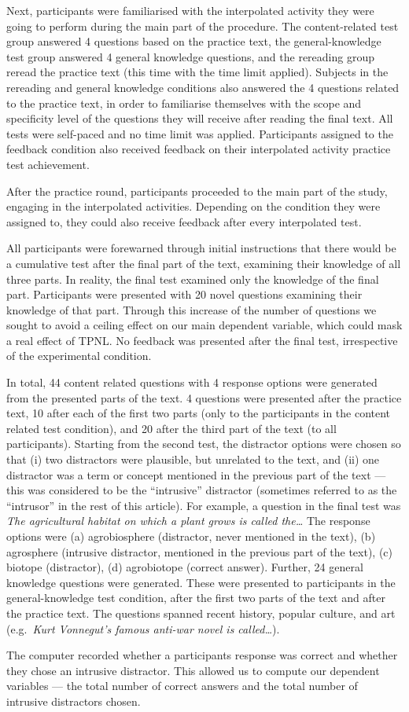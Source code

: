 Next, participants were familiarised with the interpolated activity they
were going to perform during the main part of the procedure. The
content-related test group answered 4 questions based on the practice
text, the general-knowledge test group answered 4 general knowledge
questions, and the rereading group reread the practice text (this time
with the time limit applied). Subjects in the rereading and general 
knowledge conditions also answered the 4 questions related to the
practice text, in order to familiarise themselves with the scope and
specificity level of the questions they will receive after reading the
final text. All tests were self-paced and no time limit was applied.
Participants assigned to the feedback condition also received feedback
on their interpolated activity practice test achievement.

After the practice round, participants proceeded to the main part of the
study, engaging in the interpolated activities. Depending on the condition 
they were assigned to, they could also receive feedback after every 
interpolated test.

All participants were forewarned through initial instructions that there 
would be a cumulative test after the final part of the text, examining
their knowledge of all three parts. In reality, the final test examined
only the knowledge of the final part. Participants were presented with 20 
novel questions examining their knowledge of that part. Through this 
increase of the number of questions we sought to avoid a ceiling effect on 
our main dependent variable, which could mask a real effect of TPNL. No 
feedback was presented after the final test, irrespective of the 
experimental condition.

In total, 44 content related questions with 4 response options were 
generated from the presented parts of the text. 4 questions were presented 
after the practice text, 10 after each of the first two parts (only to the 
participants in the content related test condition), and 20 after the third 
part of the text (to all participants). Starting from the second test, the 
distractor options were chosen so that (i) two distractors were plausible, 
but unrelated to the text, and (ii) one distractor was a term or concept
mentioned in the previous part of the text --- this was considered to be
the ``intrusive'' distractor (sometimes referred to as the ``intrusor''
in the rest of this article). For example, a question in the final test
was \textit{The agricultural habitat on which a plant grows is called 
the\ldots} The response options were (a) agrobiosphere (distractor, never 
mentioned in the text), (b) agrosphere (intrusive distractor, mentioned in 
the previous part of the text), (c) biotope (distractor), (d) agrobiotope
(correct answer). Further, 24 general knowledge questions were generated. 
These were presented to participants in the general-knowledge test 
condition, after the first two parts of the text and after the practice 
text. The questions spanned recent history, popular culture, and art 
(e.g.~\textit{Kurt Vonnegut's famous anti-war novel is called\ldots}).

The computer recorded whether a participants response was correct and 
whether they chose an intrusive distractor. This allowed us to compute our 
dependent variables --- the total number of correct answers and the total 
number of intrusive distractors chosen.


